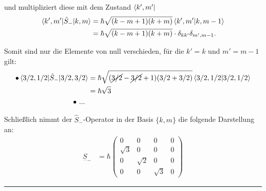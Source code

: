 \documentclass{article}
\begin{document}
{	und multipliziert diese mit dem Zustand $\bra{ k', m' }$
		\begin{align*}
			\braket{ k', m' | \hat{S}_- | k, m } &= \hbar \sqrt{ (k-m+1)(k+m) } \braket{ k', m' | k, m-1 } \\
			&= \hbar \sqrt{ (k-m+1)(k+m) } \cdot \delta_{kk'} \delta_{m',m-1}.
		\end{align*}

	Somit sind nur die Elemente von null verschieden, für die $k' = k$ und $m' = m-1$ gilt:
		\begin{align*}
			\bullet \braket{ 3/2, 1/2 | \hat{S}_- | 3/2, 3/2 } &= \hbar \sqrt{ ( \cancel{3/2} - \cancel{3/2} + 1)(3/2+3/2) } \braket{ 3/2, 1/2 | 3/2, 1/2 } \\
			&= \hbar \sqrt{ 3 } \\
			\bullet \text{ ... }
		\end{align*}


	Schließlich nimmt der $\hat{S}_-$-Operator in der Basis $\{ k, m \}$ die folgende Darstellung an:
		\begin{align*}
			\underline{S}_- &= \hbar
			\begin{pmatrix}
				0 & 0 & 0 & 0\\
				\sqrt{3} & 0 & 0 & 0\\
				0 & \sqrt{2} & 0 & 0\\
				0 & 0 & \sqrt{3} & 0
			\end{pmatrix}
		\end{align*}
\hrule
}


\newpage
\end{document}
